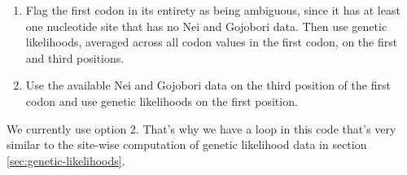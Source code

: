 \documentclass{article}
\begin{document}
	\begin{enumerate}
	  \item Flag the first codon in its entirety as being ambiguous, since
	  it has at least one nucleotide site that has no Nei and Gojobori data.
	  Then use genetic likelihoods, averaged across all codon values in the
	  first codon, on the first and third positions.

	  \item Use the available Nei and Gojobori data on the third position of
	  the first codon and use genetic likelihoods on the first position.
	\end{enumerate}

	We currently use option 2. That's why we have a loop in this code that's
	very similar to the site-wise computation of genetic likelihood data in
	section \ref{sec:genetic-likelihoods}.
\end{document}
